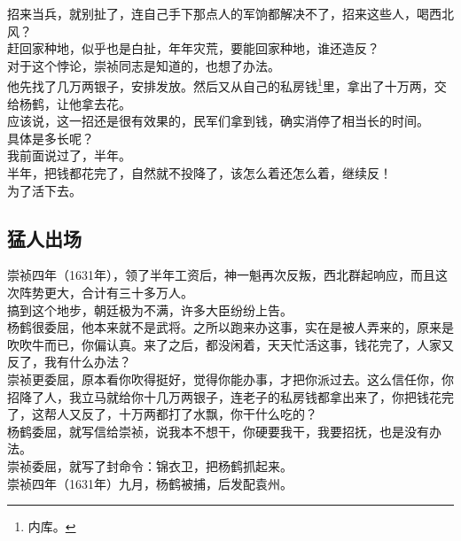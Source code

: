 \begin{multicols}{\theparacolNo}
招来当兵，就别扯了，连自己手下那点人的军饷都解决不了，招来这些人，喝西北风？\\

赶回家种地，似乎也是白扯，年年灾荒，要能回家种地，谁还造反？\\

对于这个悖论，崇祯同志是知道的，也想了办法。\\

他先找了几万两银子，安排发放。然后又从自己的私房钱\footnote{内库。}里，拿出了十万两，交给杨鹤，让他拿去花。\\

应该说，这一招还是很有效果的，民军们拿到钱，确实消停了相当长的时间。\\

具体是多长呢？\\

我前面说过了，半年。\\

半年，把钱都花完了，自然就不投降了，该怎么着还怎么着，继续反！\\

为了活下去。\\

\subsection{猛人出场}
崇祯四年（1631年），领了半年工资后，神一魁再次反叛，西北群起响应，而且这次阵势更大，合计有三十多万人。\\

搞到这个地步，朝廷极为不满，许多大臣纷纷上告。\\

杨鹤很委屈，他本来就不是武将。之所以跑来办这事，实在是被人弄来的，原来是吹吹牛而已，你偏认真。来了之后，都没闲着，天天忙活这事，钱花完了，人家又反了，我有什么办法？\\

崇祯更委屈，原本看你吹得挺好，觉得你能办事，才把你派过去。这么信任你，你招降了人，我立马就给你十几万两银子，连老子的私房钱都拿出来了，你把钱花完了，这帮人又反了，十万两都打了水飘，你干什么吃的？\\

杨鹤委屈，就写信给崇祯，说我本不想干，你硬要我干，我要招抚，也是没有办法。\\

崇祯委屈，就写了封命令：锦衣卫，把杨鹤抓起来。\\

崇祯四年（1631年）九月，杨鹤被捕，后发配袁州。\\


\end{multicols}
